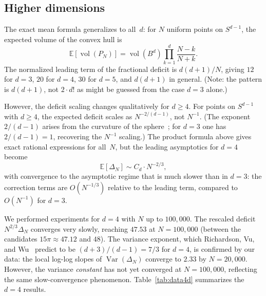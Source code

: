 \documentclass[11pt]{article}
\begin{document}
\subsection{Higher dimensions}\label{sec:higher-d}

The exact mean formula generalizes to all~$d$: for $N$ uniform
points on $S^{d-1}$, the expected volume of the convex hull is
\[
  \mathbb{E}[\operatorname{vol}(P_N)]
  = \operatorname{vol}(B^d) \prod_{k=1}^{d} \frac{N-k}{N+k}.
\]
The normalized leading term of the fractional deficit is
$d(d+1)/N$, giving $12$ for $d = 3$, $20$ for $d = 4$, $30$
for $d = 5$, and $d(d+1)$ in general.  (Note: the pattern is
$d(d+1)$, not $2\cdot d!$ as might be guessed from the case
$d = 3$ alone.)

However, the deficit scaling changes qualitatively for $d \ge 4$.
For points on $S^{d-1}$ with $d \ge 4$, the expected deficit
scales as $N^{-2/(d-1)}$, not $N^{-1}$.  (The exponent
$2/(d-1)$ arises from the curvature of the
sphere~\cite{Muller1990}; for $d = 3$ one has $2/(d-1) = 1$,
recovering the $N^{-1}$ scaling.)  The product formula above
gives exact rational expressions for all~$N$, but the leading
asymptotics for $d = 4$ become
\[
  \mathbb{E}[\Delta_N] \sim C_d \cdot N^{-2/3},
\]
with convergence to the asymptotic regime that is much slower
than in $d = 3$: the correction terms are $O(N^{-1/3})$
relative to the leading term, compared to $O(N^{-1})$ for
$d = 3$.

We performed experiments for $d = 4$ with $N$ up to
$100{,}000$.  The rescaled deficit $N^{2/3}\Delta_N$ converges
very slowly, reaching $47.53$ at $N = 100{,}000$ (between the
candidates $15\pi \approx 47.12$ and $48$).  The variance
exponent, which Richardson, Vu, and Wu~\cite{RVW2008} predict
to be $(d+3)/(d-1) = 7/3$ for $d = 4$, is confirmed by our
data: the local log-log slopes of $\operatorname{Var}(\Delta_N)$
converge to $2.33$ by $N = 20{,}000$.  However, the variance
\emph{constant} has not yet converged at $N = 100{,}000$,
reflecting the same slow-convergence phenomenon.
Table~\ref{tab:data4d} summarizes the $d = 4$ results.
\end{document}
